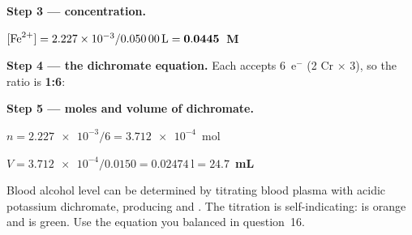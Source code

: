 \documentclass{apchem-exam}
\begin{document}
\begin{parts}
{\begin{apcanswer}
        \textbf{Step 3 --- concentration.}

        $[\ce{Fe^2+}] = \num{2.227e-3}/\SI{0.05000}{\litre}
        = \mathbf{0.0445}$~\textbf{M}

        \textbf{Step 4 --- the dichromate equation.} Each 
        accepts 6~e$^-$ (2 Cr $\times$ 3), so the ratio is \textbf{1:6}:


        \textbf{Step 5 --- moles and volume of dichromate.}

        $n = \num{2.227e-3}/6 = \num{3.712e-4}$~mol

        $V = \num{3.712e-4}/0.0150 = \SI{0.02474}{\litre}
        = \mathbf{24.7}$~\textbf{mL}\end{apcanswer}}
\end{parts}

\begin{rubric}
\end{rubric}


Blood alcohol level can be determined by titrating blood plasma with acidic
potassium dichromate, producing  and . The titration is
self-indicating:  is orange and  is green. Use the
equation you balanced in question~16.
\end{document}
